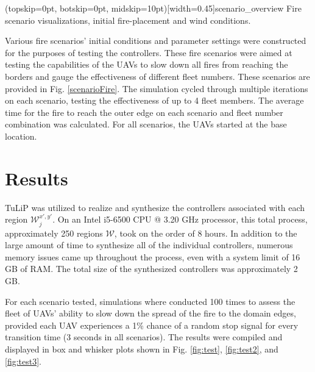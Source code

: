 \documentclass{ieeeaccess}
\begin{document}
\Figure[t!](topskip=0pt, botskip=0pt, midskip=10pt)[width=0.45\textwidth]{scenario_overview}
{Fire scenario visualizations, initial fire-placement and wind conditions.\label{scenarioFire}}

Various fire scenarios' initial conditions and parameter settings were constructed for the purposes of testing the controllers. These fire scenarios were aimed at testing the capabilities of the UAVs to slow down all fires from reaching the borders and gauge the effectiveness of different fleet numbers. These scenarios are provided in Fig. \ref{scenarioFire}. The simulation cycled through multiple iterations on each scenario, testing the effectiveness of up to 4 fleet members. The average time for the fire to reach the outer edge on each scenario and fleet number combination was calculated. For all scenarios, the UAVs started at the base location.

\section{Results}

TuLiP \cite{c12} was utilized to realize and synthesize the controllers associated with each region $\mathcal{W}_j^{x',y'}$. On an Intel i5-6500 CPU @ 3.20 GHz processor, this total process, approximately 250 regions $\mathcal{W}$, took on the order of 8 hours. In addition to the large amount of time to synthesize all of the individual controllers, numerous memory issues came up throughout the process, even with a system limit of 16 GB of RAM. The total size of the synthesized controllers was approximately 2 GB.

For each scenario tested, simulations where conducted 100 times to assess the fleet of UAVs' ability to slow down the spread of the fire to the domain edges, provided each UAV experiences a 1\% chance of a random stop signal for every transition time (3 seconds in all scenarios). The results were compiled and displayed in box and whisker plots shown in Fig. \ref{fig:test}, \ref{fig:test2}, and \ref{fig:test3}. 
\end{document}
